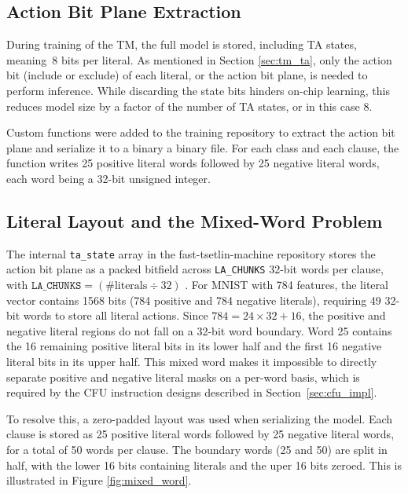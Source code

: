 \subsection{Action Bit Plane Extraction}
\label{sec:action_bit_plane}

During training of the TM, the full model is stored, including TA states, meaning~8 bits per literal. As mentioned in Section \ref{sec:tm_ta}, only the action bit (include or exclude) of each literal, or the action bit plane, is needed to perform inference. While discarding the state bits hinders on-chip learning, this reduces model size by a factor of the number of TA states, or in this case 8. 

Custom functions were added to the training repository to extract the action bit plane and serialize it to a binary a binary file. For each class and each clause, the function writes 25 positive literal words followed by 25 negative literal words, each word being a 32-bit unsigned integer.

\subsection{Literal Layout and the Mixed-Word Problem}
\label{sec:literal_layout}

The internal \texttt{ta\_state} array in the fast-tsetlin-machine repository stores the action bit plane as a packed bitfield across \texttt{LA\_CHUNKS} 32-bit words per clause, with $\texttt{LA\_CHUNKS} = (\text{\#literals}\div 32)$ \cite{cair_fast_tm_mnist}. For MNIST with 784 features, the literal vector contains 1568 bits (784 positive and 784 negative literals), requiring 49 32-bit words to store all literal actions. Since $784 = 24 \times 32 + 16$, the positive and negative literal regions do not fall on a 32-bit word boundary. Word 25 contains the 16 remaining positive literal bits in its  lower half and the first 16 negative literal bits in its upper half. This mixed word makes it impossible to directly separate positive and negative literal masks on a per-word basis, which is required by the CFU instruction designs described in Section~\ref{sec:cfu_impl}.


To resolve this, a zero-padded layout was used when serializing the model. Each clause is stored as 25 positive literal words followed by 25 negative literal words, for a total of 50 words per clause. The boundary words (25 and 50) are split in half, with the lower 16 bits containing literals and the uper 16 bits zeroed. This is illustrated in Figure \ref{fig:mixed_word}.

